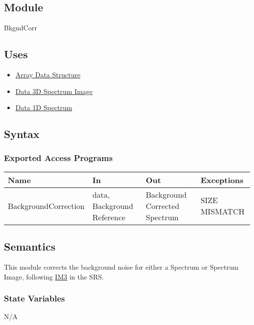 \documentclass[12pt, titlepage]{article}
\begin{document}
\subsection{Module}
BkgndCorr

\subsection{Uses}
\begin{itemize}
    \item \hyperref[Mod:Array]{Array Data Structure}
    \item \hyperref[Mod:SI]{Data 3D Spectrum Image}
    \item \hyperref[Mod:Spectrum]{Data 1D Spectrum}
\end{itemize}

\subsection{Syntax}

\subsubsection{Exported Access Programs}
\begin{center}
    \begin{tabular}{p{4cm} p{3.5cm} p{4cm} p{3cm}}
        \hline
        \textbf{Name} & \textbf{In} & \textbf{Out} & \textbf{Exceptions} \\
        \hline
        BackgroundCorrection & data, Background Reference & Background Corrected
        Spectrum & SIZE MISMATCH \\
        \hline
    \end{tabular}
\end{center}

\subsection{Semantics}
This module corrects the background noise for either a Spectrum or Spectrum
Image, following \hyperref[background]{IM3} in the SRS.

\subsubsection{State Variables}
N/A
\end{document}
